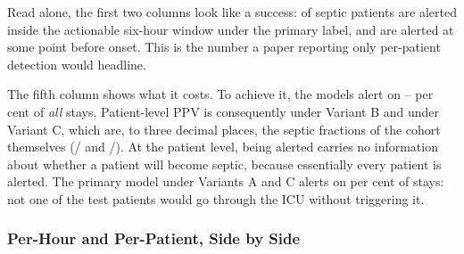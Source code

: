 Read alone, the first two columns look like a success: \pcEpSensWindowPrimaryB{}
of septic patients are alerted inside the actionable six-hour window under the
primary label, and \pcEpSensPrePrimaryB{} are alerted at some point before
onset. This is the number a paper reporting only per-patient detection would
headline.

The fifth column shows what it costs. To achieve it, the models alert on
\pcPctStaysAlertedCoxB--\pcPctStaysAlertedPrimaryA{} per cent of \emph{all}
stays. Patient-level PPV is consequently \pcPatientPpvPrimaryB{} under Variant
B and \pcPatientPpvPrimaryC{} under Variant C, which are, to three decimal
places, the septic fractions of the cohort themselves
(\pcNSepsisStaysB/\pcNTestStays{} and
\pcNSepsisStaysC/\pcNTestStays). At the patient level, being alerted carries
no information about whether a patient will become septic, because essentially
every patient is alerted. The primary model under Variants A and C alerts on
\pcPctStaysAlertedPrimaryA{} per cent of stays: not one of the \pcNTestStays{}
test patients would go through the ICU without triggering it.

\subsubsection{Per-Hour and Per-Patient, Side by Side}

